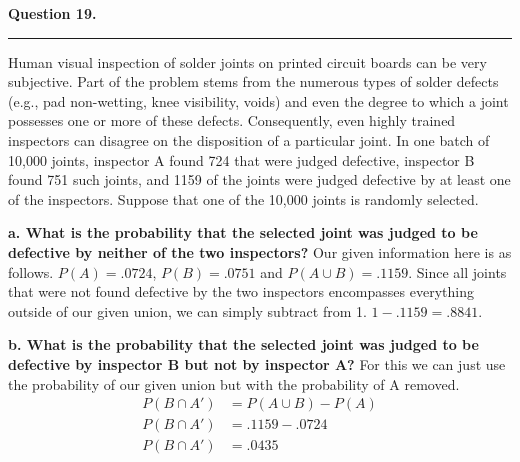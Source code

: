 \textbf{Question 19.} \\
\hrule 

Human visual inspection of solder joints on printed circuit boards can be very subjective. Part of the problem stems from the numerous types of solder defects (e.g., pad non-wetting, knee visibility, voids) and even the degree to which a joint possesses one or more of these defects. Consequently, even highly trained inspectors can disagree on the disposition of a particular joint. In one batch of 10,000 joints, inspector A found 724 that were judged defective, inspector B found 751 such joints, and 1159 of the joints were judged defective by at least one of the inspectors. Suppose that one of the 10,000 joints is randomly selected.

\textbf{a. What is the probability that the selected joint was judged to be defective by neither of the two inspectors?}
Our given information here is as follows. $P(A) = .0724$, $P(B) = .0751$ and $P(A \cup B) = .1159$. Since all joints that were not found defective by the two inspectors encompasses everything outside of our given union, we can simply subtract from 1. $1 - .1159 = .8841$.

\textbf{b. What is the probability that the selected joint was judged to be defective by inspector B but not by inspector A?}
For this we can just use the probability of our given union but with the probability of A removed.
\begin{align*}
    P(B \cap A') &= P(A \cup B) - P(A) \\
    P(B \cap A') &= .1159 - .0724 \\
    P(B \cap A') &= .0435
\end{align*}